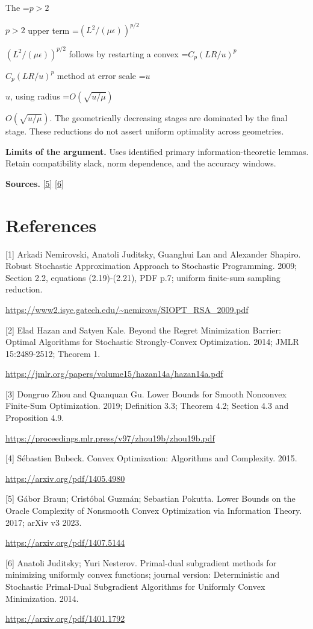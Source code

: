 \documentclass[10pt,a4paper]{article}
\newcommand{\AtlasMath}[1]{\par\begingroup\centering\setbox0=\hbox{$\displaystyle #1$}\ifdim\wd0>1.4\linewidth\typeout{ATLAS WIDE FORMULA: \the\wd0}\fi\ifdim\wd0>\linewidth\resizebox{\linewidth}{!}{\box0}\else\box0\fi\par\endgroup}
\newcommand{\AtlasInlineMath}[1]{\begingroup\setbox0=\hbox{$#1$}\ifdim\wd0>.4\linewidth\endgroup\AtlasMath{#1}\else\endgroup$#1$\fi}
\begin{document}
The \AtlasInlineMath{p>2} upper term \AtlasInlineMath{(L^2/(\mu\epsilon))^{p/2}} follows by restarting a convex \AtlasInlineMath{C_p(LR/u)^p} method at error scale \AtlasInlineMath{u}, using radius \AtlasInlineMath{O(\sqrt{u/\mu})}. The geometrically decreasing stages are dominated by the final stage. These reductions do not assert uniform optimality across geometries.

\textbf{Limits of the argument.} Uses identified primary information-theoretic lemmas. Retain compatibility slack, norm dependence, and the accuracy windows.

\textbf{Sources.} \href{https://arxiv.org/pdf/1407.5144}{[5]} \href{https://arxiv.org/pdf/1401.1792}{[6]}

\section{References}
[1] Arkadi Nemirovski, Anatoli Juditsky, Guanghui Lan and Alexander Shapiro. Robust Stochastic Approximation Approach to Stochastic Programming. 2009; Section 2.2, equations (2.19)-(2.21), PDF p.7; uniform finite-sum sampling reduction.

\url{https://www2.isye.gatech.edu/~nemirovs/SIOPT_RSA_2009.pdf}

[2] Elad Hazan and Satyen Kale. Beyond the Regret Minimization Barrier: Optimal Algorithms for Stochastic Strongly-Convex Optimization. 2014; JMLR 15:2489-2512; Theorem 1.

\url{https://jmlr.org/papers/volume15/hazan14a/hazan14a.pdf}

[3] Dongruo Zhou and Quanquan Gu. Lower Bounds for Smooth Nonconvex Finite-Sum Optimization. 2019; Definition 3.3; Theorem 4.2; Section 4.3 and Proposition 4.9.

\url{https://proceedings.mlr.press/v97/zhou19b/zhou19b.pdf}

[4] Sébastien Bubeck. Convex Optimization: Algorithms and Complexity. 2015.

\url{https://arxiv.org/pdf/1405.4980}

[5] Gábor Braun; Cristóbal Guzmán; Sebastian Pokutta. Lower Bounds on the Oracle Complexity of Nonsmooth Convex Optimization via Information Theory. 2017; arXiv v3 2023.

\url{https://arxiv.org/pdf/1407.5144}

[6] Anatoli Juditsky; Yuri Nesterov. Primal-dual subgradient methods for minimizing uniformly convex functions; journal version: Deterministic and Stochastic Primal-Dual Subgradient Algorithms for Uniformly Convex Minimization. 2014.

\url{https://arxiv.org/pdf/1401.1792}
\end{document}
